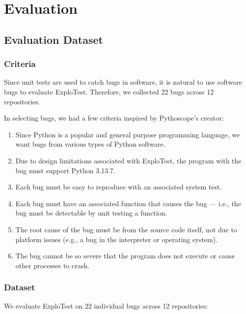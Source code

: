 \chapter{Evaluation}

\section{Evaluation Dataset}

\subsection{Criteria}

Since unit tests are used to catch bugs in software, it is natural to use software bugs to evaluate
ExploTest. Therefore, we collected 22 bugs
across 12 repositories.

In selecting bugs, we had a few criteria inspired by Pythoscope's \cite{wiatkowski2011pythoscope} creator:

\begin{enumerate}
      \item Since Python is a popular and general purpose programming language, we want bugs from various types
            of Python software.
      \item Due to design limitations associated with ExploTest, the program with the bug must support Python 3.13.7.
      \item Each bug must be easy to reproduce with an associated system test.
      \item Each bug must have an associated function that causes the bug --- i.e., the bug must be detectable by
            unit testing a function.
      \item The root cause of the bug must be from the source code itself, not due to platform issues (e.g., a
            bug in the interpreter or operating system).
      \item The bug cannot be so severe that the program does not execute or cause other processes to crash.
\end{enumerate}

\label{sec:Dataset}
\subsection{Dataset}
We evaluate ExploTest on 22 individual bugs across 12 repositories:

